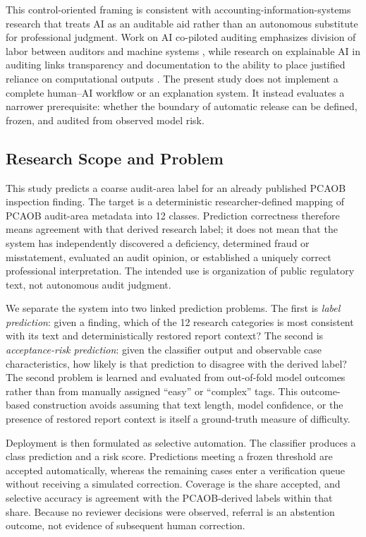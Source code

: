 \documentclass[11pt]{article}
\begin{document}
This control-oriented framing is consistent with accounting-information-systems
research that treats AI as an auditable aid rather than an autonomous substitute
for professional judgment. Work on AI co-piloted auditing emphasizes division of
labor between auditors and machine systems \cite{gu2024copiloted}, while research
on explainable AI in auditing links transparency and documentation to the ability
to place justified reliance on computational outputs \cite{zhang2022xai}. The
present study does not implement a complete human--AI workflow or an explanation
system. It instead evaluates a narrower prerequisite: whether the boundary of
automatic release can be defined, frozen, and audited from observed model risk.

\subsection{Research Scope and Problem}

This study predicts a coarse audit-area label for an already published PCAOB
inspection finding. The target is a deterministic researcher-defined mapping of
PCAOB audit-area metadata into 12 classes. Prediction correctness therefore means
agreement with that derived research label; it does not mean that the system has
independently discovered a deficiency, determined fraud or misstatement,
evaluated an audit opinion, or established a uniquely correct professional
interpretation. The intended use is organization of public regulatory text, not
autonomous audit judgment.

We separate the system into two linked prediction problems. The first is
\emph{label prediction}: given a finding, which of the 12 research categories is
most consistent with its text and deterministically restored report context? The
second is \emph{acceptance-risk prediction}: given the classifier output and
observable case characteristics, how likely is that prediction to disagree with
the derived label? The second problem is learned and evaluated from out-of-fold
model outcomes rather than from manually assigned ``easy'' or ``complex'' tags.
This outcome-based construction avoids assuming that text length, model
confidence, or the presence of restored report context is itself a ground-truth
measure of difficulty.

Deployment is then formulated as selective automation. The classifier produces a
class prediction and a risk score. Predictions meeting a frozen threshold are
accepted automatically, whereas the remaining cases enter a verification queue
without receiving a simulated correction. Coverage is the share accepted, and
selective accuracy is agreement with the PCAOB-derived labels within that share.
Because no reviewer decisions were observed, referral is an abstention outcome,
not evidence of subsequent human correction.
\end{document}
